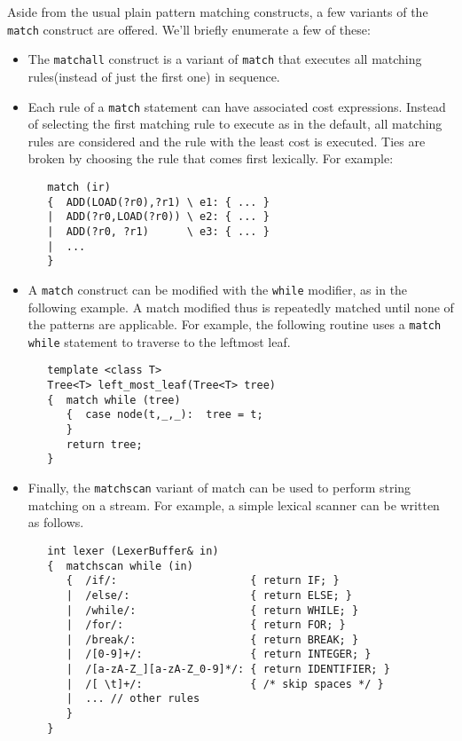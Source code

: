 Aside from the usual plain pattern matching constructs, a few variants of the
\verb|match| construct are offered.  We'll briefly enumerate a few of these:
\begin{itemize}
  \item The \verb|matchall| construct is a variant of \verb|match| that
   executes all matching rules(instead of just the first one) in sequence.
  \item Each rule of a \verb|match| statement can have associated cost
    expressions.  Instead of selecting the first matching rule to
    execute as in the default, all matching rules are considered
    and the rule with the least cost is executed.  Ties are broken by
    choosing the rule that comes first lexically.  For example:
 
   \begin{verbatim}
   match (ir)
   {  ADD(LOAD(?r0),?r1) \ e1: { ... }
   |  ADD(?r0,LOAD(?r0)) \ e2: { ... }
   |  ADD(?r0, ?r1)      \ e3: { ... }
   |  ...
   }
   \end{verbatim}
  \item A \verb|match| construct can be modified with the \verb|while|
     modifier, as in the following example.  A match modified thus is
     repeatedly matched until none of the patterns are applicable.
     For example, the following routine uses a \verb|match while| statement
     to traverse to the leftmost leaf.
 
\begin{verbatim}
   template <class T>
   Tree<T> left_most_leaf(Tree<T> tree)
   {  match while (tree)
      {  case node(t,_,_):  tree = t;
      }
      return tree;
   }
\end{verbatim}
  \item Finally, the \verb|matchscan| variant of match can be used to
     perform string matching on a stream.  For example, a simple lexical
     scanner can be written as follows.
 
     \begin{verbatim}
   int lexer (LexerBuffer& in)
   {  matchscan while (in)
      {  /if/:                     { return IF; }
      |  /else/:                   { return ELSE; }
      |  /while/:                  { return WHILE; }
      |  /for/:                    { return FOR; }
      |  /break/:                  { return BREAK; }
      |  /[0-9]+/:                 { return INTEGER; }
      |  /[a-zA-Z_][a-zA-Z_0-9]*/: { return IDENTIFIER; }
      |  /[ \t]+/:                 { /* skip spaces */ }
      |  ... // other rules
      }
   }
     \end{verbatim}
\end{itemize}

